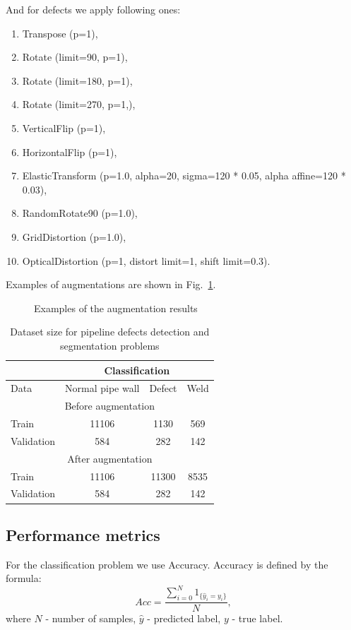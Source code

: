 And for defects we apply following ones:
\begin{enumerate}
	\item Transpose (p=1), 
	\item Rotate (limit=90, p=1), 
	\item Rotate (limit=180, p=1), 
	\item Rotate (limit=270, p=1,), 
	\item VerticalFlip (p=1), 
	\item HorizontalFlip (p=1), 
	\item ElasticTransform (p=1.0, alpha=20, sigma=120 * 0.05, alpha affine=120 * 0.03),
	\item RandomRotate90 (p=1.0),
	\item GridDistortion (p=1.0),
	\item OpticalDistortion (p=1, distort limit=1, shift limit=0.3).
\end{enumerate}
Examples of augmentations are shown in Fig.~\ref{ris:aug_example}.
\begin{figure}[ht]
	\caption{Examples of the augmentation results}
	\label{ris:aug_example}
\end{figure}


\begin{table}[!htb]
	\caption{\label{tab:alg1}Dataset size for pipeline defects detection and segmentation problems}
	\begin{center}
		\small
		\begin{tabular}{| l | c | c | c |}
			\multicolumn{1}{c}{} & \multicolumn{3}{c}{Classification} \\
			\hline
			Data& Normal pipe wall & Defect & Weld \\
			\hline
			\multicolumn{4}{|c|}{Before augmentation}  \\
			\hline
			Train  & 11106 & 1130 & 569 \\
			Validation & 584 & 282 & 142 \\
			\hline
			\multicolumn{4}{|c|}{After augmentation}  \\
			\hline
			Train  & 11106 & 11300 & 8535 \\
			Validation & 584 & 282 & 142 \\
			\hline
		\end{tabular}
	\end{center}
\end{table}

\subsection{Performance metrics}
For the classification problem we use Accuracy.
Accuracy is defined by the formula:
$$Acc = \frac{\sum_{i=0}^{N} 1_{\{\hat{y}_i=y_i\}}}{N},$$
where $N$ - number of samples, $\hat{y}$ - predicted label, $y$ - true label.
